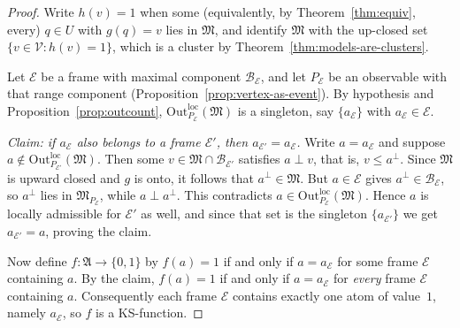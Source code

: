 \documentclass[10pt,a4paper]{amsart}
\newcommand{\Outloc}[2]{\mathrm{Out}^{\mathrm{loc}}_{#1}(#2)}
\begin{document}
\begin{proof}
Write $h(v)=1$ when some (equivalently, by Theorem~\ref{thm:equiv}, every)
$q\in U$ with $g(q)=v$ lies in $\mathfrak M$, and identify $\mathfrak M$ with
the up-closed set $\{v\in\mathcal V:h(v)=1\}$, which is a cluster by
Theorem~\ref{thm:models-are-clusters}.

Let $\mathcal E$ be a frame with maximal component $\mathcal B_{\mathcal E}$,
and let $P_{\mathcal E}$ be an observable with that range component
(Proposition~\ref{prop:vertex-as-event}).  By hypothesis and
Proposition~\ref{prop:outcount},
$\Outloc{P_{\mathcal E}}{\mathfrak M}$ is a singleton, say
$\{a_{\mathcal E}\}$ with $a_{\mathcal E}\in\mathcal E$.

\emph{Claim: if $a_{\mathcal E}$ also belongs to a frame $\mathcal E'$, then
$a_{\mathcal E'}=a_{\mathcal E}$.}
Write $a=a_{\mathcal E}$ and suppose $a\notin
\Outloc{P_{\mathcal E'}}{\mathfrak M}$.  Then some
$v\in\mathfrak M\cap\mathcal B_{\mathcal E'}$ satisfies $a\perp v$, that is,
$v\le a^{\perp}$.  Since $\mathfrak M$ is upward closed and $g$ is onto, it
follows that $a^{\perp}\in\mathfrak M$.  But $a\in\mathcal E$ gives
$a^{\perp}\in\mathcal B_{\mathcal E}$, so $a^{\perp}$ lies in
$\mathfrak M_{P_{\mathcal E}}$, while $a\perp a^{\perp}$.  This contradicts
$a\in\Outloc{P_{\mathcal E}}{\mathfrak M}$.  Hence $a$ is locally admissible
for $\mathcal E'$ as well, and since that set is the singleton
$\{a_{\mathcal E'}\}$ we get $a_{\mathcal E'}=a$, proving the claim.

Now define $f:\mathfrak A\to\{0,1\}$ by $f(a)=1$ if and only if
$a=a_{\mathcal E}$ for some frame $\mathcal E$ containing $a$.  By the claim,
$f(a)=1$ if and only if $a=a_{\mathcal E}$ for \emph{every} frame $\mathcal E$
containing $a$.  Consequently each frame $\mathcal E$ contains exactly one atom
of value~$1$, namely $a_{\mathcal E}$, so $f$ is a KS-function.
\end{proof}
\end{document}
